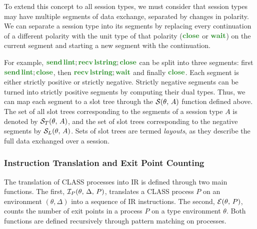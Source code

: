 \documentclass[sigconf,nonacm,natbib=true]{acmart}
\begin{document}
To extend this concept to all session types, we must consider that session types may have multiple segments of data exchange, separated by changes in polarity. We can separate a session type into its segments by replacing every continuation of a different polarity with the unit type of that polarity ($\closet$ or $\waitt$) on the current segment and starting a new segment with the continuation. 

For example, $\sendt{\lintt}{\recvt{\lstringt}{\closet}}$ can be split into three segments: first $\sendt{\lintt}{\closet}$, then $\recvt{\lstringt}{\waitt}$ and finally  $\closet$. Each segment is either strictly positive or strictly negative. Strictly negative segments can be turned into strictly positive segments by computing their dual types. Thus, we can map each segment to a slot tree through the $\mathcal{S}(\theta,\,A)$ function defined above. The set of all slot trees corresponding to the segments of a session type $A$ is denoted by $\mathcal{S}_T(\theta,\,A)$, and the set of slot trees corresponding to the negative segments by $\mathcal{S}_L(\theta,\,A)$. Sets of slot trees are termed \textit{layouts}, as they describe the full data exchanged over a session.

\subsubsection{Instruction Translation and Exit Point Counting}

The translation of \ac{CLASS} processes into \ac{IR} is defined through two main functions. The first, $\mathcal{I}_P(\theta,\,\Delta,\,P)$, translates a \ac{CLASS} process $P$ on an environment $(\theta, \Delta)$ into a sequence of \ac{IR} instructions. The second, $\mathcal{E}(\theta,\,P)$, counts the number of exit points in a process $P$ on a type environment $\theta$. Both functions are defined recursively through pattern matching on processes.
\end{document}
